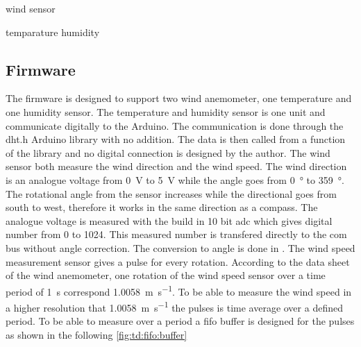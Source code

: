 
wind sensor 

temparature humidity 

\subsection{Firmware}
The firmware is designed to support two wind anemometer, one temperature and one humidity sensor. The temperature and humidity sensor is one unit and communicate digitally to the Arduino. The communication is done through the dht.h Arduino library with no addition. The data is then called from a function of the library and no digital connection is designed by the author. 
The wind sensor both measure the wind direction and the wind speed. The wind direction is an analogue voltage from \SI{0}{\volt} to \SI{5}{\volt} while the angle goes from \SI{0}{\degree} to \SI{359}{\degree}. The rotational angle from the sensor increases while the directional goes from south to west, therefore it works in the same direction as a compass. The analogue voltage is measured with the build in 10 bit \gls{adc} which gives digital number from 0 to 1024. This measured number is transfered directly to the com bus without angle correction. The conversion to angle is done in \matlab . The wind speed measurement sensor gives a pulse for every rotation. According to the data sheet of the wind anemometer, one rotation of the wind speed sensor over a time period of \SI{1}{\second} correspond \SI{1.0058}{\meter\per\second}. To be able to measure the wind speed in a higher resolution that \SI{1.0058}{\meter\per\second} the pulses is time average over a defined period. To be able to measure over a period a \gls{fifo} buffer is designed for the pulses as shown in the following \autoref{fig:td:fifo:buffer} 

